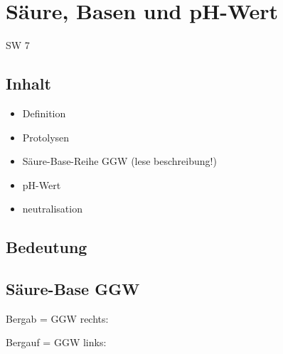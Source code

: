 \section{Säure, Basen und pH-Wert} {SW 7}

\subsection{Inhalt}
\begin{itemize}
\item Definition
\item Protolysen
\item Säure-Base-Reihe GGW (lese beschreibung!)
\item pH-Wert
\item  neutralisation
\end{itemize}

\subsection{Bedeutung}

\subsection{Säure-Base GGW}
\begin{minipage}{0.65\columnwidth}
	Bergab = GGW rechts: 
	
	Bergauf = GGW links: 
\end{minipage}
